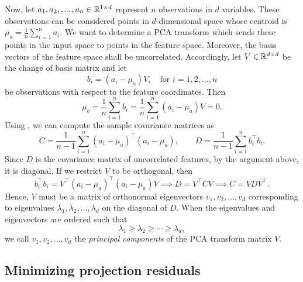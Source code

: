 Now, let \(a_1, a_2, \dots, a_n \in \mathbb{R}^{1 \times d}\) represent \(n\) observations in \(d\) variables.
These observations can be considered points in \(d\)-dimensional space whose centroid is \(\mu_a = \frac{1}{n} \sum_{i=1}^{n} a_i\).
We want to determine a PCA transform which sends these points in the input space to points in the feature space.
Moreover, the basis vectors of the feature space shall be uncorrelated.
Accordingly, let \(V \in \mathbb{R}^{d \times d}\) be the change of basis matrix and let
\begin{equation}
    \label{eqn:transformed-points}
    b_i = (a_i - \mu_a) V, \quad \text{for \(i = 1, 2, \dots, n\)}
\end{equation}
be observations with respect to the feature coordinates.
Then
\begin{equation}
    \mu_b
    = \frac{1}{n} \sum_{i=1}^{n} b_i
    = \frac{1}{n} \sum_{i=1}^{n} (a_i - \mu_a) V
    = 0.
\end{equation}
Using , we can compute the sample covariance matrices as 
\begin{equation}
    C = \frac{1}{n-1} \sum_{i=1}^{n} (a_i - \mu_a)^\top (a_i - \mu_a),
    \qquad
    D = \frac{1}{n-1} \sum_{i=1}^{n} b_i^\top b_i.
\end{equation}
Since \(D\) is the covariance matrix of uncorrelated features, by the argument above, it is diagonal.
If we restrict \(V\) to be orthogonal, then
\begin{equation}
    b_i^\top b_i = V^\top (a_i - \mu_a)^\top (a_i - \mu_a) V
    \implies
    D = V^\top C V
    \implies
    C = V D V^\top.
\end{equation}
Hence, \(V\) must be a matrix of orthonormal eigenvectors \(v_1, v_2, \dots, v_d\) corresponding to eigenvalues \(\lambda_1, \lambda_2, \dots, \lambda_d\) on the diagonal of \(D\).
When the eigenvalues and eigenvectors are ordered such that
\begin{equation}
    \lambda_1 \geq \lambda_2 \geq \cdots \geq \lambda_d,
\end{equation}
we call \(v_1, v_2, \dots, v_d\) the \textit{principal components} of the PCA transform matrix \(V\).

\subsection{Minimizing projection residuals}

